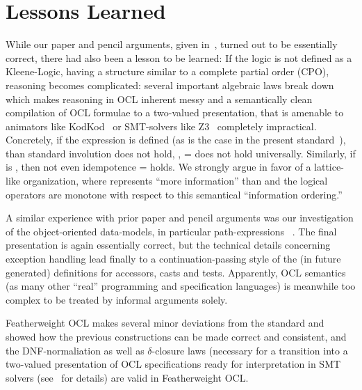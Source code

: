 \section{Lessons Learned}
While our paper and pencil arguments, given
in~\cite{brucker.ea:ocl-null:2009}, turned out to be essentially
correct, there had also been a lesson to be learned: If the logic is
not defined as a Kleene-Logic, having a structure similar to a
complete partial order (CPO), reasoning becomes complicated: several important algebraic laws break down
which makes reasoning in OCL inherent messy and a semantically clean
compilation of OCL formulae to a two-valued presentation, that is
amenable to animators like KodKod~\cite{torlak.ea:kodkod:2007} or
SMT-solvers like Z3~\cite{moura.ea:z3:2008} completely
impractical. Concretely, if the expression  
is defined  (as is the case in the
present standard~\cite{omg:ocl:2012}), than standard involution does
not hold, \ie,  =  does not hold
universally. Similarly, if
 is , then not even
idempotence  =  holds. We strongly argue in favor of a lattice-like
organization, where  represents ``more information''
than  and the logical operators are monotone with
respect to this semantical ``information ordering.''

A similar experience with prior paper and pencil arguments was our investigation
of the object-oriented data-models, in particular path-expressions
~\cite{DBLP:conf/models/BruckerLTW13}. The final presentation is again
essentially correct, but the technical details concerning exception
handling lead finally to a continuation-passing style of the
(in future generated) definitions for accessors, casts and tests.
Apparently, OCL semantics (as many other ``real'' programming and specification languages)
is meanwhile too complex to be treated by informal arguments solely.

Featherweight OCL makes several minor deviations from the standard and showed
how the previous constructions can be made correct and consistent, and
the DNF-normaliation as well as $\delta$-closure laws (necessary
for a transition into a two-valued presentation of OCL specifications
ready for interpretation in SMT solvers
(see~\cite{brucker.ea:ocl-testing:2010} for details) are valid in
Featherweight OCL.

